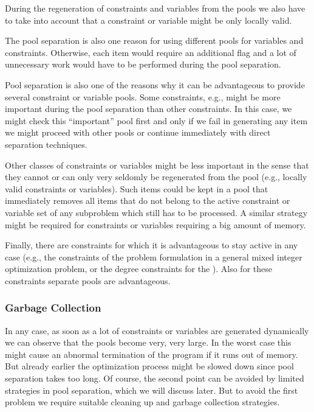 During the regeneration of constraints and variables from the pools
we also have to take into account that a constraint or variable
might be only locally valid.

The pool separation is also one reason for using different pools
for variables and constraints. Otherwise, each item would require
an additional flag and a lot of unnecessary work would have to be performed
during the pool separation.

Pool separation is also one of the reasons why it can be advantageous
to provide several constraint or variable pools. Some constraints, e.g.,
might be more important during the pool separation than other 
constraints. In this case, we might check this ``important'' pool
first and only if we fail in generating any item we might proceed
with other pools or continue immediately with direct separation
techniques. 

Other classes of constraints or variables might be less important
in the sense that they cannot or can only very seldomly be regenerated
from the pool (e.g., locally valid constraints or variables).
Such items could be kept in a pool that immediately removes all
items that do not belong to the active constraint or variable
set of any subproblem which still has to be processed.
A similar strategy might be required for constraints or variables
requiring a big amount of memory.

Finally, there are constraints for which it is advantageous to
stay active in any case (e.g., the constraints of the problem 
formulation in a general mixed integer optimization problem, 
or the degree constraints for the \tsp). Also for these
constraints separate pools are advantageous.

\subsubsection{Garbage Collection}

In any case, as soon as a lot of constraints or variables are 
generated dynamically we can observe that the pools become very, very large.
In the worst case this might cause an abnormal termination of the 
program if it runs out of memory. But already earlier the optimization
process might be slowed down since pool separation takes too long.
Of course, the second point can be avoided by limited 
strategies in pool separation, which we will discuss later. But to
avoid the first problem we require suitable cleaning up and
garbage collection strategies.

